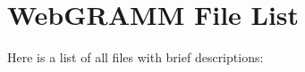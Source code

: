 \section{Web\-GRAMM File List}
Here is a list of all files with brief descriptions:\begin{CompactList}
\item{}
\item{}
\end{CompactList}
